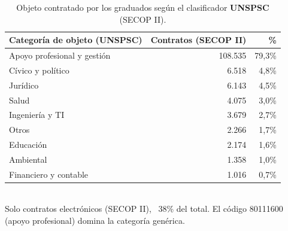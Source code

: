 \begin{table}[H]\centering\footnotesize
\caption{Objeto contratado por los graduados según el clasificador \textbf{UNSPSC} (SECOP II).}\label{tab:secop_unspsc}
\begin{tabular}{lrr}
\toprule
\rowcolor{ustaazul}\textbf{\color{white}Categoría de objeto (UNSPSC)} & \textbf{\color{white}Contratos (SECOP II)} & \textbf{\color{white}\%} \\
\midrule
Apoyo profesional y gestión & 108.535 & 79,3\% \\
Cívico y político & 6.518 & 4,8\% \\
Jurídico & 6.143 & 4,5\% \\
Salud & 4.075 & 3,0\% \\
Ingeniería y TI & 3.679 & 2,7\% \\
Otros & 2.266 & 1,7\% \\
Educación & 2.174 & 1,6\% \\
Ambiental & 1.358 & 1,0\% \\
Financiero y contable & 1.016 & 0,7\% \\
\bottomrule
\end{tabular}
\\[2pt]{\scriptsize\color{ustagris} Solo contratos electrónicos (SECOP II), ~38\% del total. El código 80111600 (apoyo profesional) domina la categoría genérica.}
\end{table}